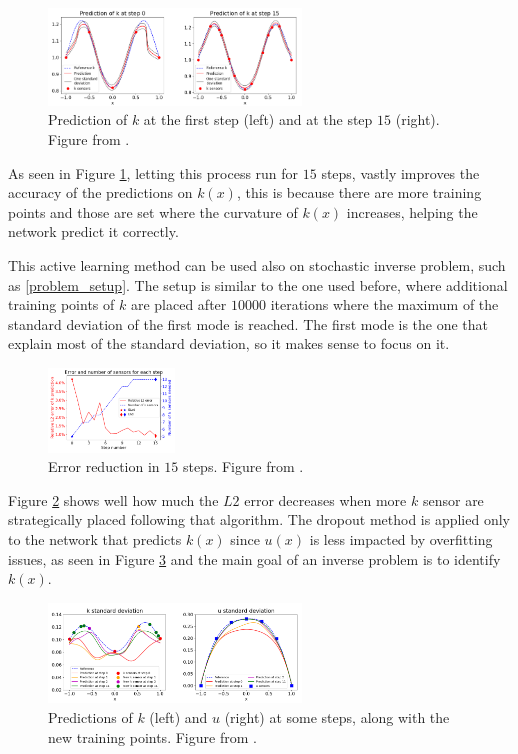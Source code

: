 \documentclass[11pt,a4paper]{article}
\begin{document}
\begin{figure}[H]
    \centering 
    \includegraphics[width=0.6\textwidth]{Images/active_learn.png}
    \captionsetup{justification=centering,margin=1cm}
    \caption{Prediction of \(k\) at the first step (left) and at the step \(15\) (right). Figure from \cite{Zhang_2019}.}
    \label{fig:act_k}
\end{figure}
As seen in Figure \ref{fig:act_k}, letting this process run for \(15\) steps, vastly improves the accuracy of the predictions on \(k(x)\), this is because there are more training points and those are set where the curvature of \(k(x)\) increases, helping the network predict it correctly. 

This active learning method can be used also on stochastic inverse problem, such as \eqref{problem_setup}. The setup is similar to the one used before, where additional training points of \(k\) are placed after \(10000\) iterations where the maximum of the standard deviation of the first mode is reached. The first mode is the one that explain most of the standard deviation, so it makes sense to focus on it.  

\begin{figure}[H]
    \centering 
    \includegraphics[width=0.3\textwidth]{Images/act_lear_2.png}
    \captionsetup{justification=centering,margin=1cm}
    \caption{Error reduction in \(15\) steps. Figure from \cite{Zhang_2019}.}
    \label{fig:act2_k}
\end{figure}
Figure \ref{fig:act2_k} shows well how much the \(L2\) error decreases when more \(k\) sensor are strategically placed following that algorithm. The dropout method is applied only to the network that predicts \(k(x)\) since \(u(x)\) is less impacted by overfitting issues, as seen in Figure \ref{fig:act3_k} and the main goal of an inverse problem is to identify \(k(x)\).
\begin{figure}[H]
    \centering 
    \includegraphics[width=0.6\textwidth]{Images/act_lear23.png}
    \captionsetup{justification=centering,margin=1cm}
    \caption{Predictions of \(k\) (left) and \(u\) (right) at some steps, along with the new training points. Figure from \cite{Zhang_2019}.}
    \label{fig:act3_k}
\end{figure}
\end{document}
